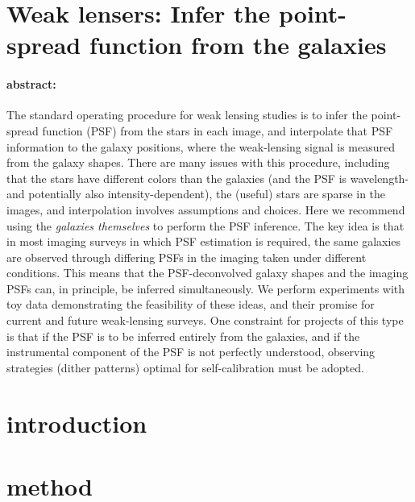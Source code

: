\documentclass[12pt,letterpaper]{article}
\begin{document}
\sloppy\sloppypar

\section*{Weak lensers: Infer the point-spread function from the galaxies}

\paragraph{abstract:}
The standard operating procedure for weak lensing studies is
  to infer the point-spread function (PSF) from the stars in each image,
  and interpolate that PSF information to the galaxy positions,
  where the weak-lensing signal is measured from the galaxy shapes.
There are many issues with this procedure, including that
  the stars have different colors than the galaxies (and the PSF is wavelength- and potentially also intensity-dependent),
  the (useful) stars are sparse in the images,
  and interpolation involves assumptions and choices.
Here we recommend using the \emph{galaxies themselves} to perform the PSF inference.
The key idea is that in most imaging surveys in which PSF estimation is required,
  the same galaxies are observed through differing PSFs in the imaging taken
  under different conditions.
This means that the PSF-deconvolved galaxy shapes and the imaging PSFs can, in principle,
  be inferred simultaneously.
We perform experiments with toy data demonstrating the feasibility of these ideas,
  and their promise for current and future weak-lensing surveys.
One constraint for projects of this type is that if the PSF is to be
  inferred entirely from the galaxies,
  and if the instrumental component of the PSF is not perfectly understood,
  observing strategies (dither patterns) optimal for self-calibration must be adopted.

\section{introduction}

\section{method}
\end{document}
